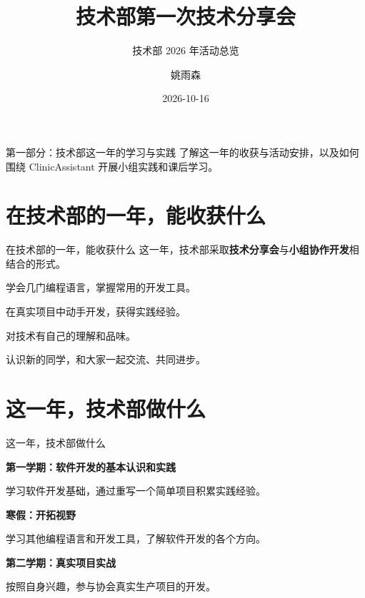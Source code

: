 \documentclass[aspectratio=169]{beamer}
\title[技术部第一次分享]{技术部第一次技术分享会}
\subtitle{技术部 2026 年活动总览}
\author{姚雨森}
\institute{技术部 分管主席}
\date{2026-10-16}
\begin{document}
\maketitle

\begin{frame}{第一部分：技术部这一年的学习与实践}
  了解这一年的收获与活动安排，以及如何围绕 ClinicAssistant 开展小组实践和课后学习。
\end{frame}

\section{在技术部的一年，能收获什么}

\begin{frame}{在技术部的一年，能收获什么}
  这一年，技术部采取\textbf{技术分享会}与\textbf{小组协作开发}相结合的形式。
  \par\medskip
  \begin{vfilleditems}
    \item 学会几门编程语言，掌握常用的开发工具。
    \item 在真实项目中动手开发，获得实践经验。
    \item 对技术有自己的理解和品味。
    \item 认识新的同学，和大家一起交流、共同进步。
  \end{vfilleditems}
\end{frame}

\section{这一年，技术部做什么}

\begin{frame}{这一年，技术部做什么}
  \begin{vfilleditems}
    \item \textbf{第一学期：软件开发的基本认识和实践}\par
      学习软件开发基础，通过重写一个简单项目积累实践经验。
    \item \textbf{寒假：开拓视野}\par
      学习其他编程语言和开发工具，了解软件开发的各个方向。
    \item \textbf{第二学期：真实项目实战}\par
      按照自身兴趣，参与协会真实生产项目的开发。
  \end{vfilleditems}
\end{frame}
\end{document}
